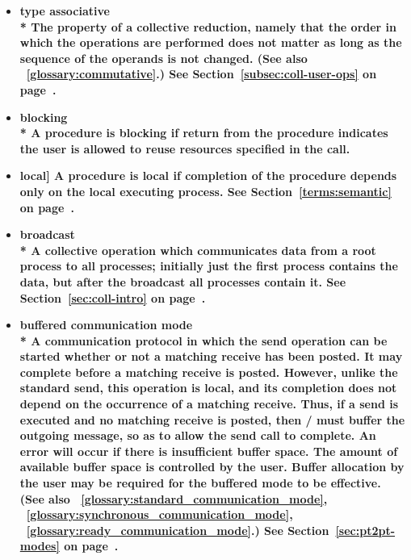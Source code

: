\begin{itemize}
\label{glossary:associative}
\item \bf{ type associative} \\*
The property of a collective reduction, namely that the order in which the operations are 
performed does not matter as long as the sequence of the operands is not changed. 
(See also ~\ref{glossary:commutative}.)
See Section~\ref{subsec:coll-user-ops} on page~\pageref{subsec:coll-user-ops}.

\label{glossary:blocking}
\item \bf{ blocking} \\*
A procedure is blocking if return from the procedure indicates the user
is allowed to reuse resources specified in the call.
\item \bf{ local}]
A procedure is local if completion of the procedure depends only on the
local executing process.
See Section~\ref{terms:semantic} on page~\pageref{terms:semantic}.

\label{glossary:broadcast}
\item \bf{ broadcast} \\*
A collective operation which communicates data from a root process to all processes;
initially just the first process contains the data, but after the
broadcast all processes contain it.
See Section~\ref{sec:coll-intro} on page~\pageref{sec:coll-intro}.

\label{glossary:buffered_communication_mode}
\item \bf{ buffered communication mode} \\*
A communication protocol in which the
send operation can be started whether or not a
matching receive has been posted.
It may complete before a matching receive is posted.  However, unlike
the standard send, this operation is {\bf local}, and its
completion does not depend on the occurrence of a matching receive.  Thus, if a
send is executed and no matching receive is posted, then \MPI/ must buffer the
outgoing message, so as to allow the send call to complete.   An error will
occur if there is insufficient buffer space.   The amount of available buffer
space is controlled by the user.
Buffer allocation by the user may be required for the buffered mode to be
effective. 
(See also ~\ref{glossary:standard_communication_mode}, 
~\ref{glossary:synchronous_communication_mode},
~\ref{glossary:ready_communication_mode}.)
See Section~\ref{sec:pt2pt-modes} on page~\pageref{sec:pt2pt-modes}.


\end{itemize}
